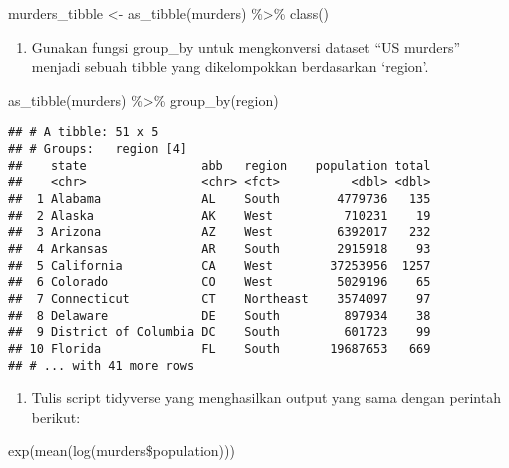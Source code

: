 \documentclass[
]{article}
\newenvironment{Shaded}{\begin{snugshade}}{\end{snugshade}}
\newcommand{\FunctionTok}[1]{\textcolor[rgb]{0.00,0.00,0.00}{#1}}
\newcommand{\NormalTok}[1]{#1}
\newcommand{\OtherTok}[1]{\textcolor[rgb]{0.56,0.35,0.01}{#1}}
\newcommand{\SpecialCharTok}[1]{\textcolor[rgb]{0.00,0.00,0.00}{#1}}
\providecommand{\tightlist}{%
  \setlength{\itemsep}{0pt}\setlength{\parskip}{0pt}}
\begin{document}
\begin{Shaded}
\begin{Highlighting}[]
\NormalTok{murders\_tibble }\OtherTok{\textless{}{-}} \FunctionTok{as\_tibble}\NormalTok{(murders) }\SpecialCharTok{\%\textgreater{}\%} \FunctionTok{class}\NormalTok{() }
\end{Highlighting}
\end{Shaded}

\begin{enumerate}
\def\labelenumi{\arabic{enumi}.}
\setcounter{enumi}{1}
\tightlist
\item
  Gunakan fungsi group\_by untuk mengkonversi dataset ``US murders''
  menjadi sebuah tibble yang dikelompokkan berdasarkan `region'.
\end{enumerate}

\begin{Shaded}
\begin{Highlighting}[]
\FunctionTok{as\_tibble}\NormalTok{(murders) }\SpecialCharTok{\%\textgreater{}\%} \FunctionTok{group\_by}\NormalTok{(region)}
\end{Highlighting}
\end{Shaded}

\begin{verbatim}
## # A tibble: 51 x 5
## # Groups:   region [4]
##    state                abb   region    population total
##    <chr>                <chr> <fct>          <dbl> <dbl>
##  1 Alabama              AL    South        4779736   135
##  2 Alaska               AK    West          710231    19
##  3 Arizona              AZ    West         6392017   232
##  4 Arkansas             AR    South        2915918    93
##  5 California           CA    West        37253956  1257
##  6 Colorado             CO    West         5029196    65
##  7 Connecticut          CT    Northeast    3574097    97
##  8 Delaware             DE    South         897934    38
##  9 District of Columbia DC    South         601723    99
## 10 Florida              FL    South       19687653   669
## # ... with 41 more rows
\end{verbatim}

\begin{enumerate}
\def\labelenumi{\arabic{enumi}.}
\setcounter{enumi}{2}
\tightlist
\item
  Tulis script tidyverse yang menghasilkan output yang sama dengan
  perintah berikut:
\end{enumerate}

exp(mean(log(murders\$population)))
\end{document}
